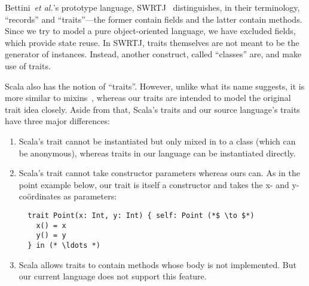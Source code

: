 Bettini~\textit{et al.}'s prototype language,
SWRTJ~\cite{bettini2010prototypical} distinguishes, in their terminology,
``records'' and ``traits''---the former contain fields and the latter contain
methods. Since we try to model a pure object-oriented language, we have excluded
fields, which provide state reuse. In SWRTJ, traits themselves are not meant to
be the generator of instances. Instead, another construct, called ``classes''
are, and make use of traits.


Scala also has the notion of ``traits''. However, unlike what its name suggests,
it is more similar to mixins~\cite{bracha1990mixin}, whereas our traits are
intended to model the original trait idea closely. Aside from that, Scala's
traits and our source language's traits have three major differences:

\begin{enumerate}

  \item Scala's trait cannot be instantiated but only mixed in to a class (which
  can be anonymous), whereas traits in our language can be instantiated
  directly.

  \item Scala's trait cannot take constructor parameters whereas ours can. As in
  the point example below, our trait is itself a constructor and takes the x- and
  y-coördinates as parameters:

  \begin{lstlisting}
  trait Point(x: Int, y: Int) { self: Point (*$ \to $*)
    x() = x
    y() = y
  } in (* \ldots *)
  \end{lstlisting}

  \item Scala allows traits to contain methods whose body is not implemented.
  But our current language does not support this feature.

\end{enumerate}
